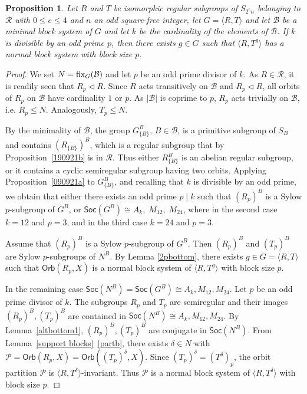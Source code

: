\documentclass[11pt]{amsart}
\numberwithin{equation}{section}
\newtheorem{prop}[thrm]{Proposition}
\theoremstyle{definition}
\newcounter{case}
\def\fix{{\rm fix}}
\def\la{\langle}
\def\ra{\rangle}
\def\soc{{\mathsf{Soc}}}
\newcommand{\sg}[1]{\langle{#1}\rangle}
\begin{document}
	\begin{prop}\label{300921a} Let $R$ and $T$ be isomorphic regular subgroups of $S_{2^en}$ belonging to $\mathcal{R}$ with $0\le e\le 4$ and $n$ an odd square-free integer, 
		let $G = \la R,T\ra$  and let $\mathcal{B}$ be a minimal   block system of $G$ and let $k$ be the cardinality of the elements of $\mathcal{B}$. If $k$ is divisible by an odd prime $p$, then there exists $g\in G$ such that $\sg{R,T^g}$ has a normal block system with block size $p$.
	\end{prop}
	
	\begin{proof}
		We set $N = \fix_G({\mathcal B})$ and let $p$ be an odd prime divisor of $k$. As $R \in \mathcal R$, it is readily seen  that $R_p \triangleleft R$. Since $R$ acts transitively on ${\mathcal  B}$ and $R_p\triangleleft R$, all orbits of $R_p$ on ${\mathcal  B}$ have cardinality $1$ or $p$. As $|{\mathcal  B}|$ is coprime to $p$,  $R_p$ acts trivially on ${\mathcal  B}$, i.e. $R_p\leq N$. Analogously, $T_p\leq  N$. 
		
		By the minimality of $\mathcal B$, the group $G_{\{B\}}^B$, $B\in{\mathcal  B}$,  is a primitive subgroup of $S_{B}$ and contains $(R_{\{B\}})^B$, which is a regular subgroup that by Proposition~\ref{190921b} is in $\mathcal{R}$.  Thus either $R_{\{B\}}^B$ is an abelian regular subgroup, or it contains a cyclic semiregular subgroup having two orbits. Applying Proposition~\ref{090921a} to $G_{\{B\}}^B$, and recalling that $k$ is divisible by an odd prime, we obtain that either there exists an odd prime $p \mid k$ such that $(R_p)^B$ is a Sylow $p$-subgroup of $G^B$, or $
		\soc(G^B) \cong A_k,\; M_{12},\; M_{24}$,
		where in the second case $k = 12$ and $p = 3$, and in the third case $k = 24$ and $p = 3$.
		
		Assume that $(R_p)^B$ is a Sylow $p$-subgroup of $G^B$. Then $(R_p)^B$ and $(T_p)^B$ are Sylow $p$-subgroups of $N^B$. By Lemma \ref{2pbottom}, there exists $g\in G=\sg{R,T}$ such that $\mathsf{Orb}(R_p,X)$ is a normal block system of $\sg{R,T^g}$ with block size $p$.
		
		In the remaining case $\soc(N^B)=\soc(G^B)\cong A_k,M_{12},M_{24}$. Let $p$ be an odd prime divisor of $k$.
		The subgroups $R_p$ and $T_p$ are semiregular and their images $(R_p)^B,(T_p)^B$ are contained in $\soc(N^B)\cong A_k,M_{12},M_{24}$. By Lemma~\ref{altbottom1},  $(R_p)^B,(T_p)^B$ are conjugate  in $\soc(N^B)$. From Lemma~\ref{support blocks}~\eqref{partb}, there exists $\delta\in N$ with $\mathcal{P}=\mathsf{Orb}(R_p,X) = \mathsf{Orb}((T_p)^\delta,X)$. Since $(T_p)^\delta = (T^\delta)_p$,
		the orbit partition $\mathcal {P}$ is $\sg{R,T^\delta}$-invariant. Thus $\mathcal{P}$ is a normal block system of $\langle R,T^\delta\rangle$  with block size $p$.
	\end{proof}
	
\end{document}
